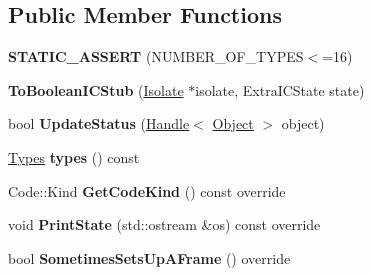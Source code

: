 \subsection*{Public Member Functions}
\begin{DoxyCompactItemize}
\item 
{\bfseries S\+T\+A\+T\+I\+C\+\_\+\+A\+S\+S\+E\+RT} (N\+U\+M\+B\+E\+R\+\_\+\+O\+F\+\_\+\+T\+Y\+P\+ES$<$=16)\hypertarget{classv8_1_1internal_1_1_to_boolean_i_c_stub_a6e671bb6bf89a6ceb796fd0ca47b463a}{}\label{classv8_1_1internal_1_1_to_boolean_i_c_stub_a6e671bb6bf89a6ceb796fd0ca47b463a}

\item 
{\bfseries To\+Boolean\+I\+C\+Stub} (\hyperlink{classv8_1_1internal_1_1_isolate}{Isolate} $\ast$isolate, Extra\+I\+C\+State state)\hypertarget{classv8_1_1internal_1_1_to_boolean_i_c_stub_a1a1753987f34dd02190f95a12864384e}{}\label{classv8_1_1internal_1_1_to_boolean_i_c_stub_a1a1753987f34dd02190f95a12864384e}

\item 
bool {\bfseries Update\+Status} (\hyperlink{classv8_1_1internal_1_1_handle}{Handle}$<$ \hyperlink{classv8_1_1internal_1_1_object}{Object} $>$ object)\hypertarget{classv8_1_1internal_1_1_to_boolean_i_c_stub_a82abf043c53f5ff6739daf9d5da51e3a}{}\label{classv8_1_1internal_1_1_to_boolean_i_c_stub_a82abf043c53f5ff6739daf9d5da51e3a}

\item 
\hyperlink{classv8_1_1internal_1_1_to_boolean_i_c_stub_1_1_types}{Types} {\bfseries types} () const \hypertarget{classv8_1_1internal_1_1_to_boolean_i_c_stub_a48e7d88106545c29ad9276ba4068b5ca}{}\label{classv8_1_1internal_1_1_to_boolean_i_c_stub_a48e7d88106545c29ad9276ba4068b5ca}

\item 
Code\+::\+Kind {\bfseries Get\+Code\+Kind} () const  override\hypertarget{classv8_1_1internal_1_1_to_boolean_i_c_stub_acebf4aedf914f3b4be5dc0db84d3e6f1}{}\label{classv8_1_1internal_1_1_to_boolean_i_c_stub_acebf4aedf914f3b4be5dc0db84d3e6f1}

\item 
void {\bfseries Print\+State} (std\+::ostream \&os) const  override\hypertarget{classv8_1_1internal_1_1_to_boolean_i_c_stub_afc46b16195c02aa04836c29c3d74098d}{}\label{classv8_1_1internal_1_1_to_boolean_i_c_stub_afc46b16195c02aa04836c29c3d74098d}

\item 
bool {\bfseries Sometimes\+Sets\+Up\+A\+Frame} () override\hypertarget{classv8_1_1internal_1_1_to_boolean_i_c_stub_aac9219d060e2abcdf1b79471cfe7e734}{}\label{classv8_1_1internal_1_1_to_boolean_i_c_stub_aac9219d060e2abcdf1b79471cfe7e734}


\end{DoxyCompactItemize}
